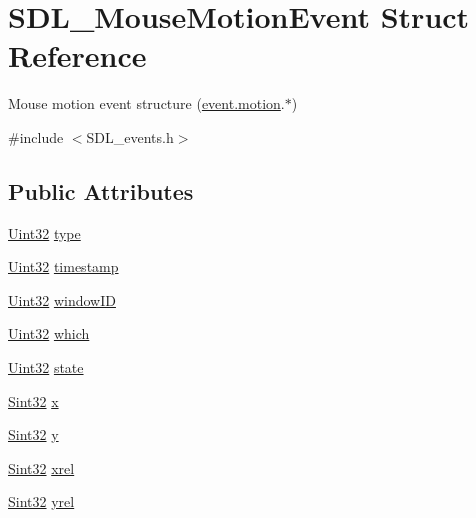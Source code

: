 \hypertarget{struct_s_d_l___mouse_motion_event}{}\section{S\+D\+L\+\_\+\+Mouse\+Motion\+Event Struct Reference}
\label{struct_s_d_l___mouse_motion_event}


Mouse motion event structure (\hyperlink{union_s_d_l___event_ac3c89e190faacbe84280cd539453bab6}{event.\+motion}.$\ast$)  




{\ttfamily \#include $<$S\+D\+L\+\_\+events.\+h$>$}

\subsection*{Public Attributes}
\begin{DoxyCompactItemize}
\item 
\hyperlink{_s_d_l__stdinc_8h_add440eff171ea5f55cb00c4a9ab8672d}{Uint32} \hyperlink{struct_s_d_l___mouse_motion_event_a431dd28cd6db6a7335cf633dbeb80cfb}{type}
\item 
\hyperlink{_s_d_l__stdinc_8h_add440eff171ea5f55cb00c4a9ab8672d}{Uint32} \hyperlink{struct_s_d_l___mouse_motion_event_af530bc0ef327ea6d497c5b1da119841c}{timestamp}
\item 
\hyperlink{_s_d_l__stdinc_8h_add440eff171ea5f55cb00c4a9ab8672d}{Uint32} \hyperlink{struct_s_d_l___mouse_motion_event_aa9976725242ada93a9e18e7fdf5796e6}{window\+ID}
\item 
\hyperlink{_s_d_l__stdinc_8h_add440eff171ea5f55cb00c4a9ab8672d}{Uint32} \hyperlink{struct_s_d_l___mouse_motion_event_a6f04c17b4305683915e2fd2dc3c36dbc}{which}
\item 
\hyperlink{_s_d_l__stdinc_8h_add440eff171ea5f55cb00c4a9ab8672d}{Uint32} \hyperlink{struct_s_d_l___mouse_motion_event_a3f6e9bad9d959b824881ba09e05b7024}{state}
\item 
\hyperlink{_s_d_l__stdinc_8h_a7a90b941db9d4582e9ad7abb9940ff7e}{Sint32} \hyperlink{struct_s_d_l___mouse_motion_event_a36398bb4a5308446a262b0bfc8baa80a}{x}
\item 
\hyperlink{_s_d_l__stdinc_8h_a7a90b941db9d4582e9ad7abb9940ff7e}{Sint32} \hyperlink{struct_s_d_l___mouse_motion_event_a7e6a7b1f8713d1968dc913908e8ea448}{y}
\item 
\hyperlink{_s_d_l__stdinc_8h_a7a90b941db9d4582e9ad7abb9940ff7e}{Sint32} \hyperlink{struct_s_d_l___mouse_motion_event_a1c01d9aba2a20778fb45a15dca39ef58}{xrel}
\item 
\hyperlink{_s_d_l__stdinc_8h_a7a90b941db9d4582e9ad7abb9940ff7e}{Sint32} \hyperlink{struct_s_d_l___mouse_motion_event_a7674c8b92d039ab948f671a180fa7b30}{yrel}
\end{DoxyCompactItemize}


